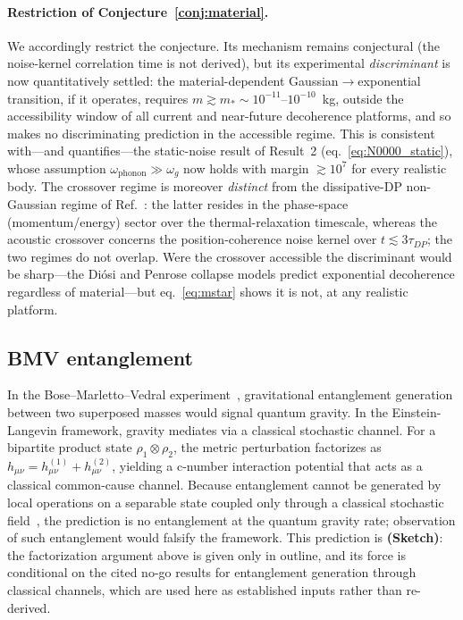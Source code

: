 \documentclass[12pt,a4paper]{article}
\theoremstyle{remark}
\begin{document}
\paragraph{Restriction of Conjecture~\ref{conj:material}.} We accordingly restrict the
conjecture. Its mechanism remains conjectural (the noise-kernel correlation time is not
derived), but its experimental \emph{discriminant} is now quantitatively settled: the
material-dependent Gaussian$\to$exponential transition, if it operates, requires
$m\gtrsim m_\ast\sim10^{-11}$--$10^{-10}$~kg, outside the accessibility window of all
current and near-future decoherence platforms, and so makes no discriminating prediction
in the accessible regime. This is consistent with---and quantifies---the static-noise
result of Result~2 (eq.~\eqref{eq:N0000_static}), whose assumption
$\omega_{\text{phonon}}\gg\omega_g$ now holds with margin $\gtrsim10^{7}$ for every
realistic body. The crossover regime is moreover \emph{distinct} from the
dissipative-DP non-Gaussian regime of Ref.~\cite{melo_dissipative}: the latter resides in
the phase-space (momentum/energy) sector over the thermal-relaxation timescale, whereas
the acoustic crossover concerns the position-coherence noise kernel over $t\lesssim
3\tau_{DP}$; the two regimes do not overlap. Were the crossover accessible the discriminant
would be sharp---the Di\'osi and Penrose collapse models predict exponential decoherence
regardless of material---but eq.~\eqref{eq:mstar} shows it is not, at any realistic
platform.

\subsection{BMV entanglement}

In the Bose--Marletto--Vedral experiment~\cite{bose,marletto_vedral}, gravitational
entanglement generation between two superposed masses would signal quantum gravity. In the
Einstein-Langevin framework, gravity mediates via a classical stochastic channel. For a
bipartite product state $\rho_1\otimes\rho_2$, the metric perturbation factorizes as
$h_{\mu\nu} = h^{(1)}_{\mu\nu} + h^{(2)}_{\mu\nu}$, yielding a c-number interaction
potential that acts as a classical common-cause channel. Because entanglement cannot
be generated by local operations on a separable state coupled only through a classical
stochastic field~\cite{kafri,oppenheim,marletto_classical}, the prediction is no
entanglement at the quantum gravity rate; observation of such entanglement would falsify
the framework. This prediction is \textbf{(Sketch)}: the factorization argument above is
given only in outline, and its force is conditional on the cited no-go results for
entanglement generation through classical channels, which are used here as established
inputs rather than re-derived.
\end{document}
